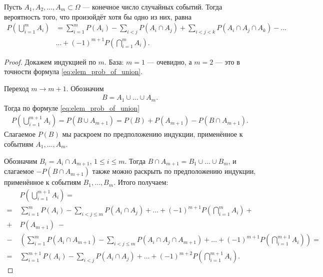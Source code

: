 \documentclass[../main.tex]{subfiles}
\begin{document}
\begin{prop}
 \label{proposition:inclusion_exclusion_formula}
 Пусть $ A_1, A_2, \ldots, A_m \subset \Omega $ --- конечное число случайных событий. Тогда вероятность того, что произойдёт хотя бы одно из них, равна
 \begin{equation}
  \begin{aligned}
   \label{eq:inclusion_exclusion_formula}
   P\left( \bigcup_{i=1}^{m} A_i \right) &= \sum_{i=1}^{m} P(A_i) - \sum_{i < j} P(A_i \cap A_j) + \sum_{i < j < k}  P(A_i \cap A_j \cap A_k) - \ldots \\
   &\ldots + (-1)^{m + 1} P\left( \bigcap_{i=1}^{m} A_i \right).
  \end{aligned}
 \end{equation} 
\end{prop}
\begin{proof}
 Докажем индукцией по $ m $. База: $ m=1 $ --- очевидно, а $ m=2 $ --- это в точности формула \eqref{eq:elem_prob_of_union}.

 Переход $ m \to m + 1 $. Обозначим
 \begin{align*}
  B = A_1 \cup \ldots \cup A_m.
 \end{align*} Тогда по формуле \eqref{eq:elem_prob_of_union}
 \begin{align*}
  P \left( \bigcup_{i=1}^{m+1} A_i \right) = P(B \cup A_{m+1}) = P(B) + P(A_{m+1}) - P(B \cap A_{m+1}).
 \end{align*} Слагаемое $P(B)$ мы раскроем по предположению индукции, применённое к событиям $ A_1, \ldots, A_m $.

 Обозначим $B_i = A_i \cap A_{m+1}$, $ 1 \leqslant i \leqslant m $. Тогда $B \cap A_{m+1} = B_1 \cup \ldots \cup B_m$, и слагаемое $ -P(B \cap A_{m+1}) $ также можно раскрыть по предположению индукции, применённое к событиям $ B_1, \ldots, B_m $. Итого получаем:
 \begin{align*}
  &P \left( \bigcup_{i=1}^{m+1}A_i \right) = \\
  =\;&\sum_{i=1}^{m}P(A_i) - \sum_{i < j \leqslant m} P(A_i \cap A_j) + \ldots + (-1)^{m+1}P \left( \bigcap_{i=1}^{m}A_i \right) + \\
  +\;&P(A_{m+1}) \; - \\
  -\;&\left( \sum_{i=1}^{m} P(A_i \cap A_{m+1}) - \sum_{i < j \leqslant m} P(A_i \cap A_j \cap A_{m+1}) + \ldots + (-1)^{m+1}P \left( \bigcap_{i=1}^{m+1} A_i \right) \right) = \\
  =\;&\sum_{i=1}^{m+1}P(A_i) - \sum_{i < j}P(A_i \cap A_j) + \ldots + (-1)^{m+2}P \left( \bigcap_{i=1}^{m+1}A_i \right).
 \end{align*}
\end{proof}
\end{document}
